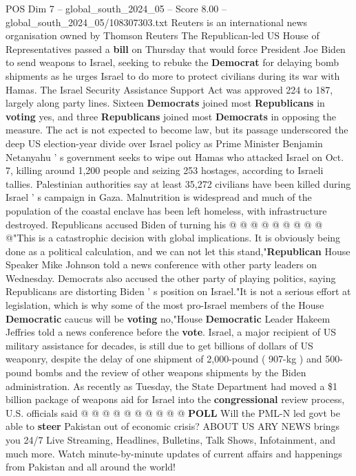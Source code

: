 \begin{textsample}{POS Dim 7 – global\_south\_2024\_05 – Score 8.00 – global\_south\_2024\_05/108307303.txt}  \label{ex:f7_pos_208}
Reuters is an international news organisation owned by Thomson Reuters The Republican-led US House of Representatives passed a \textbf{bill} on Thursday that would force President Joe Biden to send weapons to Israel, seeking to rebuke the \textbf{Democrat} for delaying bomb shipments as he urges Israel to do more to protect civilians during its war with Hamas.
The Israel Security Assistance Support Act was approved 224 to 187, largely along party lines.
Sixteen \textbf{Democrats} joined most \textbf{Republicans} in \textbf{voting} yes, and three \textbf{Republicans} joined most \textbf{Democrats} in opposing the measure.
The act is not expected to become law, but its passage underscored the deep US election-year divide over Israel policy as Prime Minister Benjamin Netanyahu ' s government seeks to wipe out Hamas who attacked Israel on Oct. 7, killing around 1,200 people and seizing 253 hostages, according to Israeli tallies.
Palestinian authorities say at least 35,272 civilians have been killed during Israel ' s campaign in Gaza.
Malnutrition is widespread and much of the population of the coastal enclave has been left homeless, with infrastructure destroyed.
Republicans accused Biden of turning his @ @ @ @ @ @ @ @ @ @"This is a catastrophic decision with global implications.
It is obviously being done as a political calculation, and we can not let this stand,"\textbf{Republican} House Speaker Mike Johnson told a news conference with other party leaders on Wednesday.
Democrats also accused the other party of playing politics, saying Republicans are distorting Biden ' s position on Israel."It is not a serious effort at legislation, which is why some of the most pro-Israel members of the House \textbf{Democratic} caucus will be \textbf{voting} no,"House \textbf{Democratic} Leader Hakeem Jeffries told a news conference before the \textbf{vote}.
Israel, a major recipient of US military assistance for decades, is still due to get billions of dollars of US weaponry, despite the delay of one shipment of 2,000-pound ( 907-kg ) and 500-pound bombs and the review of other weapons shipments by the Biden administration.
As recently as Tuesday, the State Department had moved a \$1 billion package of weapons aid for Israel into the \textbf{congressional} review process, U.S. officials said @ @ @ @ @ @ @ @ @ @ \textbf{POLL} Will the PML-N led govt be able to \textbf{steer} Pakistan out of economic crisis?
ABOUT US ARY NEWS brings you 24/7 Live Streaming, Headlines, Bulletins, Talk Shows, Infotainment, and much more.
Watch minute-by-minute updates of current affairs and happenings from Pakistan and all around the world!

\end{textsample}
